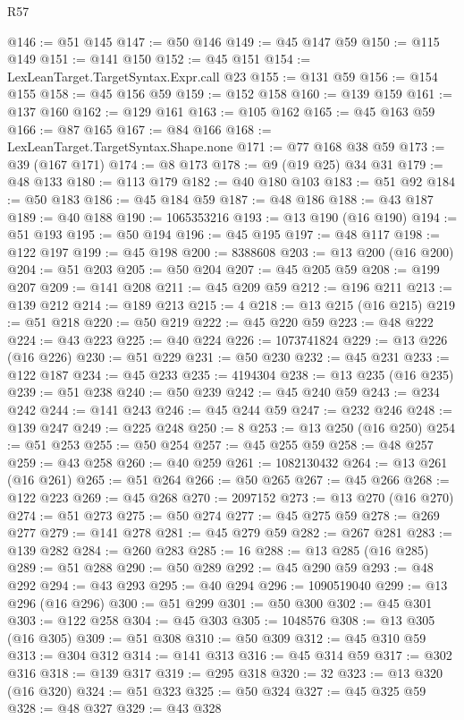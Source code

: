 \begin{lexlean}{R57}
\begin{coremodule}
@146 := @51 @145
@147 := @50 @146
@149 := @45 @147 @59
@150 := @115 @149
@151 := @141 @150
@152 := @45 @151
@154 := LexLeanTarget.TargetSyntax.Expr.call @23
@155 := @131 @59
@156 := @154 @155
@158 := @45 @156 @59
@159 := @152 @158
@160 := @139 @159
@161 := @137 @160
@162 := @129 @161
@163 := @105 @162
@165 := @45 @163 @59
@166 := @87 @165
@167 := @84 @166
@168 := LexLeanTarget.TargetSyntax.Shape.none
@171 := @77 @168 @38 @59
@173 := @39 (@167 @171)
@174 := @8 @173
@178 := @9 (@19 @25) @34 @31
@179 := @48 @133
@180 := @113 @179
@182 := @40 @180 @103
@183 := @51 @92
@184 := @50 @183
@186 := @45 @184 @59
@187 := @48 @186
@188 := @43 @187
@189 := @40 @188
@190 := 1065353216
@193 := @13 @190 (@16 @190)
@194 := @51 @193
@195 := @50 @194
@196 := @45 @195
@197 := @48 @117
@198 := @122 @197
@199 := @45 @198
@200 := 8388608
@203 := @13 @200 (@16 @200)
@204 := @51 @203
@205 := @50 @204
@207 := @45 @205 @59
@208 := @199 @207
@209 := @141 @208
@211 := @45 @209 @59
@212 := @196 @211
@213 := @139 @212
@214 := @189 @213
@215 := 4
@218 := @13 @215 (@16 @215)
@219 := @51 @218
@220 := @50 @219
@222 := @45 @220 @59
@223 := @48 @222
@224 := @43 @223
@225 := @40 @224
@226 := 1073741824
@229 := @13 @226 (@16 @226)
@230 := @51 @229
@231 := @50 @230
@232 := @45 @231
@233 := @122 @187
@234 := @45 @233
@235 := 4194304
@238 := @13 @235 (@16 @235)
@239 := @51 @238
@240 := @50 @239
@242 := @45 @240 @59
@243 := @234 @242
@244 := @141 @243
@246 := @45 @244 @59
@247 := @232 @246
@248 := @139 @247
@249 := @225 @248
@250 := 8
@253 := @13 @250 (@16 @250)
@254 := @51 @253
@255 := @50 @254
@257 := @45 @255 @59
@258 := @48 @257
@259 := @43 @258
@260 := @40 @259
@261 := 1082130432
@264 := @13 @261 (@16 @261)
@265 := @51 @264
@266 := @50 @265
@267 := @45 @266
@268 := @122 @223
@269 := @45 @268
@270 := 2097152
@273 := @13 @270 (@16 @270)
@274 := @51 @273
@275 := @50 @274
@277 := @45 @275 @59
@278 := @269 @277
@279 := @141 @278
@281 := @45 @279 @59
@282 := @267 @281
@283 := @139 @282
@284 := @260 @283
@285 := 16
@288 := @13 @285 (@16 @285)
@289 := @51 @288
@290 := @50 @289
@292 := @45 @290 @59
@293 := @48 @292
@294 := @43 @293
@295 := @40 @294
@296 := 1090519040
@299 := @13 @296 (@16 @296)
@300 := @51 @299
@301 := @50 @300
@302 := @45 @301
@303 := @122 @258
@304 := @45 @303
@305 := 1048576
@308 := @13 @305 (@16 @305)
@309 := @51 @308
@310 := @50 @309
@312 := @45 @310 @59
@313 := @304 @312
@314 := @141 @313
@316 := @45 @314 @59
@317 := @302 @316
@318 := @139 @317
@319 := @295 @318
@320 := 32
@323 := @13 @320 (@16 @320)
@324 := @51 @323
@325 := @50 @324
@327 := @45 @325 @59
@328 := @48 @327
@329 := @43 @328

\end{coremodule}
\end{lexlean}
